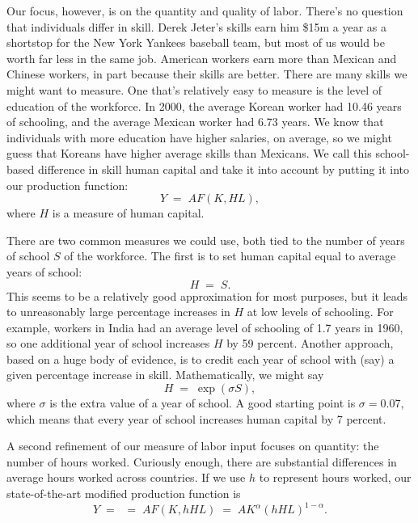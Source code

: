 Our focus, however, is on the quantity and quality of labor.
There's no question that individuals differ in skill.
Derek Jeter's skills earn him
\$15m a year as a shortstop for the New York Yankees baseball team,
but most of us would be worth far less in the same job.
American workers earn more than Mexican and Chinese workers,
in part because their skills are better.
There are many skills we might want to measure.
One that's relatively easy to measure is the level of education of the
workforce.
In 2000, the average Korean worker had 10.46 years of
schooling, and the average Mexican worker had 6.73 years. We know
that individuals with more education have higher salaries, on
average, so we might guess that Koreans have higher average skills
than Mexicans. We call this school-based difference in skill
human capital and take it into account by putting
it into our production function:
\[
    Y \;=\; A F(K,HL),
\]
where $H$ is a measure of human capital.


There are two common measures we could use,
both tied to the number of years of school $S$ of the workforce.
The first is to set human capital equal to average years of school:
\[
    H \;=\; S .
\]
This seems to be a relatively good approximation for most purposes,
but it leads to unreasonably large percentage increases in $H$
at low levels of schooling.
For example, workers in India had an average level of schooling
of 1.7 years in 1960,
so one additional year of school increases $H$ by 59 percent.
Another approach, based on a huge body of evidence,
is to credit each year of school with (say) a given percentage
increase in skill.
Mathematically, we might say
\[
    H \;=\; \exp( \sigma S ) ,
\]
where $\sigma$ is the extra value of a year of school.
A good starting point is $\sigma = 0.07$,
which means that every year of school increases
human capital by 7 percent.


A second refinement of our measure of labor input focuses on quantity:
the number of hours worked.
Curiously enough, there are substantial differences
in average hours worked across countries.
If we use $h$ to represent hours worked, our state-of-the-art
modified production function is
\begin{equation}
    Y \;=\; \;=\; A F(K,hHL)
      \;=\;  A K^{\alpha} (hHL)^{1-\alpha}.
      \label{eq:pf-mod}
\end{equation}



